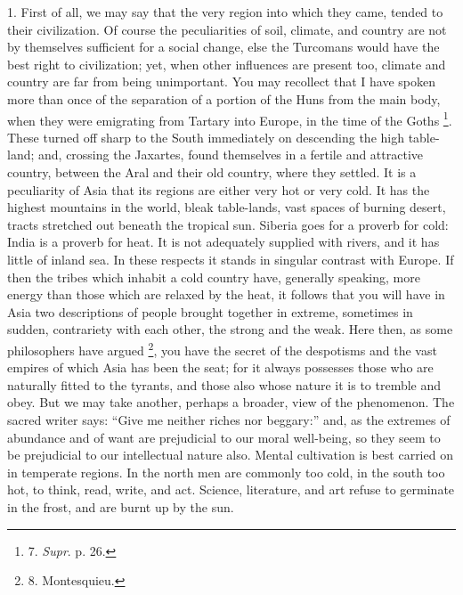 1. First of all, we may say
that the very region into which they came, tended to their
civilization. Of course the peculiarities of soil, climate, and
country are not by themselves sufficient for a social change, else the
Turcomans would have the best right to civilization; yet, when other
influences are present too, climate and country are far from being
unimportant. You may recollect that I have spoken more than once of
the separation of a portion of the Huns from the main body, when they
were emigrating from Tartary into Europe, in the time of the Goths \footnote{7.
\emph{Supr}. p. 26.}. These turned off sharp to the South immediately on descending
the high table-land; and, crossing the Jaxartes, found themselves in a
fertile and attractive country, between the Aral and their old
country, where they settled. It is a peculiarity of Asia that its
regions are either very hot or very cold. It has the highest mountains
in the world, bleak table-lands, vast spaces of burning desert, tracts
stretched out beneath the tropical sun. Siberia goes for a proverb for
cold: India is a proverb for heat. It is not adequately supplied with
rivers, and it has little of inland sea. In these respects it stands
in singular contrast with Europe. If then the tribes which inhabit a
cold country have, generally speaking, more energy than those which
are relaxed by the heat, it follows that you will have in Asia two
descriptions of people brought together in extreme, sometimes in
sudden, contrariety with each other, the strong and the weak. Here
then, as some philosophers have argued \footnote{8.
Montesquieu.}, you have the secret of the despotisms and the vast empires of
which Asia has been the seat; for it always possesses those who are
naturally fitted to the tyrants, and those also whose nature it is to
tremble and obey. But we may take another, perhaps a broader, view of
the phenomenon. The sacred writer says: ``Give me neither riches nor
beggary:'' and, as the extremes of abundance and of want are
prejudicial to our moral well-being, so they seem to be prejudicial to
our intellectual nature also. Mental cultivation is best carried on in
temperate regions. In the north men are commonly too cold, in the
south too hot, to think, read, write, and act. Science, literature,
and art refuse to germinate in the frost, and are burnt up by the sun.

